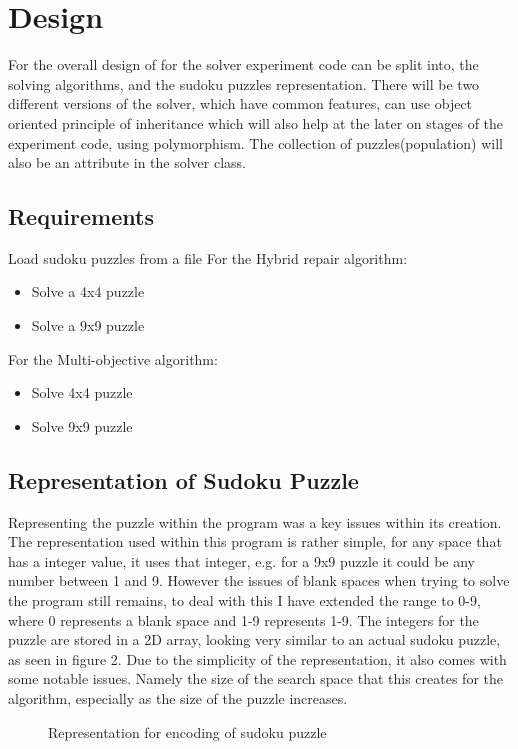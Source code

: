 \documentclass[a4paper,11pt]{article}
\begin{document}
\section{Design}
For the overall design of for the solver experiment code can be split into, the solving algorithms, and the sudoku puzzles representation. There will be two different versions of the solver, which have common features, can use object oriented principle of inheritance which will also help at the later on stages of the experiment code, using polymorphism. The collection of puzzles(population) will also be an attribute in the solver class.

\subsection{Requirements}

Load sudoku puzzles from a file
For the Hybrid repair algorithm:
\begin{itemize}
	\item Solve a 4x4 puzzle  
	\item Solve a 9x9 puzzle
\end{itemize}

For the Multi-objective algorithm:
\begin{itemize}
	\item Solve 4x4 puzzle
	\item Solve 9x9 puzzle
\end{itemize}



\subsection{Representation of Sudoku Puzzle}
Representing the puzzle within the program was a key issues within its creation. The representation used within this program is rather simple, for any space that has a integer value, it uses that integer, e.g. for a 9x9 puzzle it could be any number between 1 and 9. However the issues of blank spaces when trying to solve the program still remains, to deal with this I have extended the range to 0-9, where 0 represents a blank space and 1-9 represents 1-9. The integers for the puzzle are stored in a 2D array, looking very similar to an actual sudoku puzzle, as seen in figure 2. Due to the simplicity of the representation, it also comes with some notable issues. Namely the size of the search space that this creates for the algorithm, especially as the size of the puzzle increases. 
\begin{figure}[h]
	\caption{Representation for encoding of sudoku puzzle}
	\centering
\end{figure}
\end{document}
